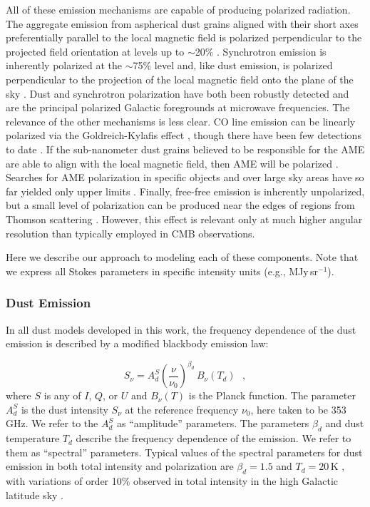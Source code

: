 \documentclass[twocolumn]{aastex631}
\begin{document}
All of these emission mechanisms are capable of producing polarized radiation. The aggregate emission from aspherical dust grains aligned with their short axes preferentially parallel to the local magnetic field is polarized perpendicular to the projected field orientation at levels up to $\sim$20\% \citep{planck2014-XIX}. Synchrotron emission is inherently polarized at the $\sim$75\% level and, like dust emission, is polarized perpendicular to the projection of the local magnetic field onto the plane of the sky \citep{Rybicki:1986}. Dust and synchrotron polarization have both been robustly detected and are the principal polarized Galactic foregrounds at microwave frequencies. The relevance of the other mechanisms is less clear. CO line emission can be linearly polarized via the Goldreich-Kylafis effect \citep{Goldreich:1981}, though there have been few detections to date \citep[e.g.,][]{Greaves:1999, Greaves:2002, Cortes:2008, Houde:2013}. If the sub-nanometer dust grains believed to be responsible for the AME are able to align with the local magnetic field, then AME will be polarized \citep{Draine:1998a}. Searches for AME polarization in specific objects and over large sky areas have so far yielded only upper limits \citep[e.g.,][]{Genova-Santos:2017, Herman:2023}. Finally, free-free emission is inherently unpolarized, but a small level of polarization can be produced near the edges of  regions from Thomson scattering \citep{Rybicki:1986}. However, this effect is relevant only at much higher angular resolution than typically employed in CMB observations.

Here we describe our approach to modeling each of these components. Note that we express all Stokes parameters in specific intensity units (e.g., MJy\,sr$^{-1}$).

\subsubsection{Dust Emission} \label{subsubsec:dust_model}
In all dust models developed in this work, the frequency dependence of the dust emission is described by a modified blackbody emission law:

\begin{equation} \label{eq:dust-emission-law}
    S_\nu = A_d^S \left(\frac{\nu}{\nu_0}\right)^{\beta_d} \, B_\nu(T_d)
    ~~~,
\end{equation}
where $S$ is any of $I$, $Q$, or $U$ and $B_\nu\left(T\right)$ is the Planck function. The parameter $A_d^S$ is the dust intensity $S_\nu$ at the reference frequency $\nu_0$, here taken to be 353\,GHz. We refer to the $A_d^S$ as ``amplitude'' parameters. The parameters $\beta_d$ and dust temperature $T_d$ describe the frequency dependence of the emission. We refer to them as ``spectral'' parameters. Typical values of the spectral parameters for dust emission in both total intensity and polarization are $\beta_d = 1.5$ and $T_d = 20$\,K \citep{planck2016-l11A}, with variations of order 10\% observed in total intensity in the high Galactic latitude sky \citep[e.g.,][]{planck2014-a12, planck2016-XLVIII}.
\end{document}
